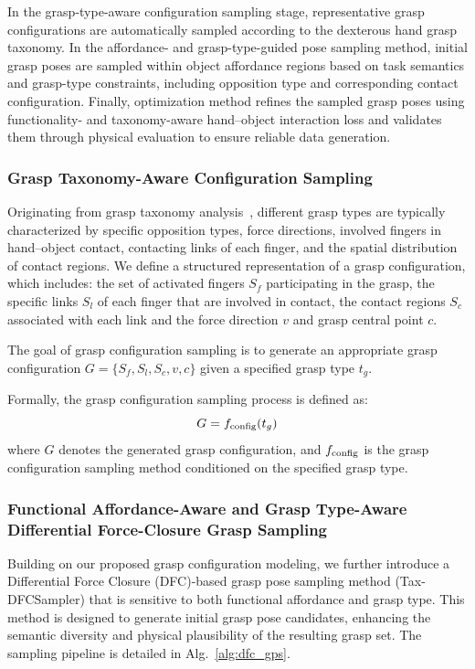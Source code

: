 In the grasp-type-aware configuration sampling stage, representative grasp configurations are automatically sampled according to the dexterous hand grasp taxonomy. In the affordance- and grasp-type-guided pose sampling method, initial grasp poses are sampled within object affordance regions based on task semantics and grasp-type constraints, including opposition type and corresponding contact configuration. Finally, optimization method refines the sampled grasp poses using functionality- and taxonomy-aware hand–object interaction loss and validates them through physical evaluation to ensure reliable data generation.

\subsubsection{Grasp Taxonomy-Aware Configuration Sampling}

Originating from grasp taxonomy analysis~\cite{feix2015grasp}, different grasp types are typically characterized by specific opposition types, force directions, involved fingers in hand–object contact, contacting links of each finger, and the spatial distribution of contact regions. 
We define a structured representation of a grasp configuration, which includes: the set of activated fingers $S_f$ participating in the grasp, the specific links $S_l$ of each finger that are involved in contact, the contact regions $S_c$ associated with each link and the force direction $v$ and grasp central point $c$.

The goal of grasp configuration sampling is to generate an appropriate grasp configuration $G = \{S_f, S_l, S_c, v, c\}$ given a specified grasp type $t_g$. 

Formally, the grasp configuration sampling process is defined as:
\begin{equation}
    G = f_{\rm config}(t_g)
\end{equation}
where $G$ denotes the generated grasp configuration, and $f_{\rm config}$ is the grasp configuration sampling method conditioned on the specified grasp type.



\subsubsection{Functional Affordance-Aware and Grasp Type-Aware Differential Force-Closure Grasp Sampling}


Building on our proposed grasp configuration modeling, we further introduce a Differential Force Closure (DFC)-based grasp pose sampling method (Tax-DFCSampler) that is sensitive to both functional affordance and grasp type. This method is designed to generate initial grasp pose candidates, enhancing the semantic diversity and physical plausibility of the resulting grasp set. The sampling pipeline is detailed in Alg.~\ref{alg:dfc_gps}. 

